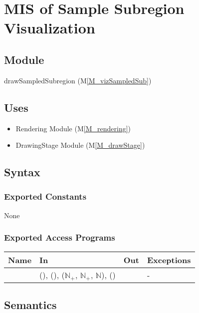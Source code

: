 \documentclass[12pt, titlepage]{article}
\newcommand{\mref}[1]{M\ref{#1}}
\newcommand{\mrefp}[1]{(\mref{#1})}
\newcommand{\mreff}[1]{Module \mrefp{#1}}
\begin{document}
\newpage



\section{MIS of Sample Subregion Visualization} \label{MS_vizSampledSub}

\subsection{Module}
drawSampledSubregion \mrefp{M_vizSampledSub}

\subsection{Uses}
\begin{itemize}
  \item Rendering \mreff{M_rendering}
  \item DrawingStage \mreff{M_drawStage}
\end{itemize}

\subsection{Syntax}

\subsubsection{Exported Constants}
None
\subsubsection{Exported Access Programs}

\begin{center}
\begin{tabular}{L{5cm} L{4cm} L{4cm} L{2cm}}
\hline
\textbf{Name} & \textbf{In} & \textbf{Out} & \textbf{Exceptions} \\
\hline
{} &  (),
   (),
   ($\mathbb{N}_+$, $\mathbb{N}_+$, $\mathbb{N}$),
   () &  & - \\
\hline
\end{tabular}
\end{center}

\subsection{Semantics}
\end{document}

